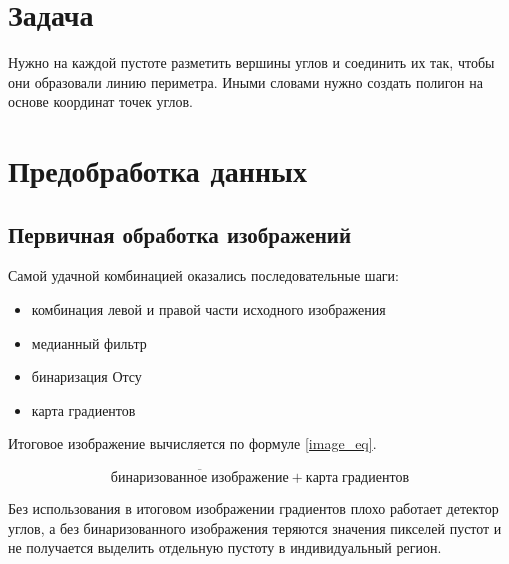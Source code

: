 \documentclass[a4paper, 14pt]{article}
\begin{document}
	\section{Задача}
	
	Нужно на каждой пустоте разметить вершины углов и соединить их так, чтобы они образовали линию периметра. Иными словами нужно создать полигон на основе координат точек углов.
	
	\section{Предобработка данных}
	\subsection{Первичная обработка изображений}
	
	Самой удачной комбинацией оказались последовательные шаги:
	\begin{itemize}
		
		\item комбинация левой и правой части исходного изображения
		
		\item медианный фильтр
		
		\item бинаризация Отсу
		
		\item карта градиентов
		
	\end{itemize}

	Итоговое изображение вычисляется по формуле \ref{image_eq}.
	
	\begin{equation}
		\label{image_eq}
		\overline{бинаризованное\;изображение}+ карта\;градиентов
	\end{equation}

	Без использования в итоговом изображении градиентов плохо работает детектор углов, а без бинаризованного изображения теряются значения пикселей пустот и не получается выделить отдельную пустоту в индивидуальный регион.
	
\end{document}
